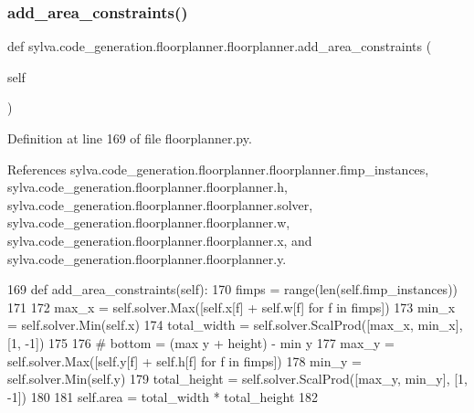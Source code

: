 \subsubsection{\texorpdfstring{add\+\_\+area\+\_\+constraints()}{add\_area\_constraints()}}
{\footnotesize\ttfamily def sylva.\+code\+\_\+generation.\+floorplanner.\+floorplanner.\+add\+\_\+area\+\_\+constraints (\begin{DoxyParamCaption}\item[{}]{self }\end{DoxyParamCaption})}



Definition at line 169 of file floorplanner.\+py.



References sylva.\+code\+\_\+generation.\+floorplanner.\+floorplanner.\+fimp\+\_\+instances, sylva.\+code\+\_\+generation.\+floorplanner.\+floorplanner.\+h, sylva.\+code\+\_\+generation.\+floorplanner.\+floorplanner.\+solver, sylva.\+code\+\_\+generation.\+floorplanner.\+floorplanner.\+w, sylva.\+code\+\_\+generation.\+floorplanner.\+floorplanner.\+x, and sylva.\+code\+\_\+generation.\+floorplanner.\+floorplanner.\+y.


\begin{DoxyCode}
169   \textcolor{keyword}{def }add\_area\_constraints(self):
170     fimps = range(len(self.fimp\_instances))
171 
172     max\_x = self.solver.Max([self.x[f] + self.w[f] \textcolor{keywordflow}{for} f \textcolor{keywordflow}{in} fimps])
173     min\_x = self.solver.Min(self.x)
174     total\_width = self.solver.ScalProd([max\_x, min\_x], [1, -1])
175 
176     \textcolor{comment}{# bottom = (max y + height) - min y}
177     max\_y = self.solver.Max([self.y[f] + self.h[f] \textcolor{keywordflow}{for} f \textcolor{keywordflow}{in} fimps])
178     min\_y = self.solver.Min(self.y)
179     total\_height = self.solver.ScalProd([max\_y, min\_y], [1, -1])
180 
181     self.area = total\_width * total\_height
182 
\end{DoxyCode}
\mbox{\label{classsylva_1_1code__generation_1_1floorplanner_1_1floorplanner_a8fa40b80a9a8bed617cb297758c0c5b5}} 
